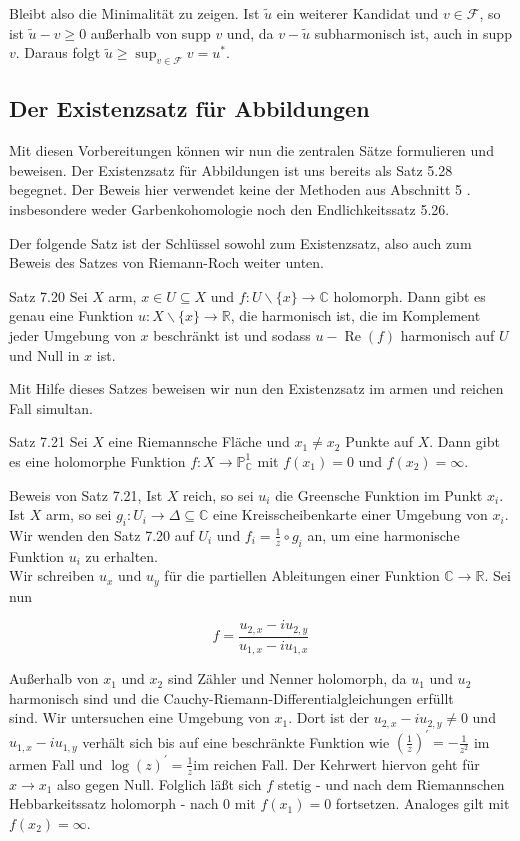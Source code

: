 \documentclass[10pt, letterpaper]{article}
\begin{document}
Bleibt also die Minimalität zu zeigen. Ist $\widetilde{u}$ ein weiterer Kandidat und $v \in \mathcal{F}$, so ist $\widetilde{u}-v \geqslant 0$ außerhalb von supp $v$ und, da $v-\widetilde{u}$ subharmonisch ist, auch in supp $v$. Daraus folgt $\widetilde{u} \geqslant \sup _{v \in \mathcal{F}} v=u^{*}$.

\subsection {Der Existenzsatz für Abbildungen}
Mit diesen Vorbereitungen können wir nun die zentralen Sätze formulieren und beweisen. Der Existenzsatz für Abbildungen ist uns bereits als Satz 5.28 begegnet. Der Beweis hier verwendet keine der Methoden aus Abschnitt 5 . insbesondere weder Garbenkohomologie noch den Endlichkeitssatz 5.26.

Der folgende Satz ist der Schlüssel sowohl zum Existenzsatz, also auch zum Beweis des Satzes von Riemann-Roch weiter unten.

Satz 7.20 Sei $X$ arm, $x \in U \subseteq X$ und $f: U \backslash\{x\} \longrightarrow \mathbb{C}$ holomorph. Dann gibt es genau eine Funktion $u: X \backslash\{x\} \longrightarrow \mathbb{R}$, die harmonisch ist, die im Komplement jeder Umgebung von $x$ beschränkt ist und sodass $u-\operatorname{Re}(f)$ harmonisch auf $U$ und Null in $x$ ist.

Mit Hilfe dieses Satzes beweisen wir nun den Existenzsatz im armen und reichen Fall simultan.

Satz 7.21 Sei $X$ eine Riemannsche Fläche und $x_{1} \neq x_{2}$ Punkte auf $X$. Dann gibt es eine holomorphe Funktion $f: X \longrightarrow \mathbb{P}_{\mathbb{C}}^{1}$ mit $f\left(x_{1}\right)=0$ und $f\left(x_{2}\right)=\infty$.

Beweis von Satz 7.21, Ist $X$ reich, so sei $u_{i}$ die Greensche Funktion im Punkt $x_{i}$. Ist $X$ arm, so sei $g_{i}: U_{i} \rightarrow \Delta \subseteq \mathbb{C}$ eine Kreisscheibenkarte einer Umgebung von $x_{i}$. Wir wenden den Satz 7.20 auf $U_{i}$ und $f_{i}=\frac{1}{z} \circ g_{i}$ an, um eine harmonische Funktion $u_{i}$ zu erhalten.\\
Wir schreiben $u_{x}$ und $u_{y}$ für die partiellen Ableitungen einer Funktion $\mathbb{C} \rightarrow \mathbb{R}$. Sei nun

$$
f=\frac{u_{2, x}-i u_{2, y}}{u_{1, x}-i u_{1, x}}
$$

Außerhalb von $x_{1}$ und $x_{2}$ sind Zähler und Nenner holomorph, da $u_{1}$ und $u_{2}$ harmonisch sind und die Cauchy-Riemann-Differentialgleichungen erfüllt\\
sind. Wir untersuchen eine Umgebung von $x_{1}$. Dort ist der $u_{2, x}-i u_{2, y} \neq 0$ und $u_{1, x}-i u_{1, y}$ verhält sich bis auf eine beschränkte Funktion wie $\left(\frac{1}{z}\right)^{\prime}=-\frac{1}{z^{2}}$ im armen Fall und $\log (z)^{\prime}=\frac{1}{z} \mathrm{im}$ reichen Fall. Der Kehrwert hiervon geht für $x \rightarrow x_{1}$ also gegen Null. Folglich läßt sich $f$ stetig - und nach dem Riemannschen Hebbarkeitssatz holomorph - nach 0 mit $f\left(x_{1}\right)=0$ fortsetzen. Analoges gilt mit $f\left(x_{2}\right)=\infty$.
\end{document}
